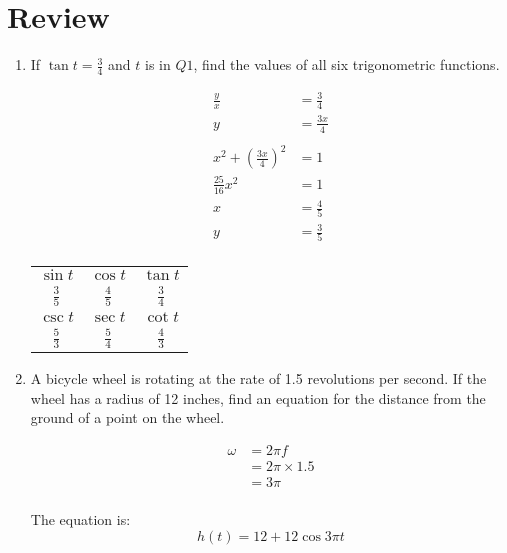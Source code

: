\documentclass{exam}
\begin{document}
  \section{Review}
  \begin{enumerate}
    \item If $\tan t = \frac{3}{4}$ and $t$ is in $Q1$, find the values of all six trigonometric functions.

      \begin{solution}
        \begin{align*}
          \frac{y}{x} & = \frac{3}{4} \\
          y           & = \frac{3x}{4} \\
          \\
          x^2 + \left( \frac{3x}{4} \right)^2 &= 1 \\
          \frac{25}{16} x^2 & = 1 \\
          x                 & = \frac{4}{5} \\
          y                 & = \frac{3}{5} \\
        \end{align*}

        \begin{tabular}[H]{ccc}
          \toprule
          $\sin t$      & $\cos t$      & $\tan t$      \\
          $\frac{3}{5}$ & $\frac{4}{5}$ & $\frac{3}{4}$ \\

          \midrule

          $\csc t$      & $\sec t$      & $\cot t$ \\
          $\frac{5}{3}$ & $\frac{5}{4}$ & $\frac{4}{3}$ \\

          \bottomrule
        \end{tabular}

      \end{solution}

    \item A bicycle wheel is rotating at the rate of 1.5 revolutions per second.  If the wheel has a radius of 12
      inches, find an equation for the distance from the ground of a point on the wheel.

      \begin{solution}
        \begin{align*}
          \omega & = 2 \pi f \\
                 & = 2 \pi \times 1.5 \\
                 & = 3 \pi \\
        \end{align*}

        The equation is:
        \[
          h(t) = 12 + 12 \cos 3 \pi t 
        \]
      \end{solution}

  \end{enumerate}
\end{document}
